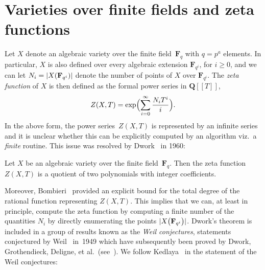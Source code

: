 

\section{Varieties over finite fields and zeta functions}

Let $X$ denote an algebraic variety over the finite field~$\mathbf{F}_q$ 
with $q = p^a$ elements.  In particular, $X$ is also defined 
over every algebraic extension $\mathbf{F}_{q^i}$, for $i \geq 0$, 
and we can let $N_i = \lvert X(\mathbf{F}_{q^i}) \rvert$ denote the number 
of points of $X$ over $\mathbf{F}_{q^i}$.  The \emph{zeta function} 
of $X$ is then defined as the formal power series in $\mathbf{Q}[[T]]$,
\begin{equation*}
Z(X, T) = \exp \Bigl( \sum_{i=0}^{\infty} \frac{N_i T^i}{i} \Bigr).
\end{equation*}
In the above form, the power series~$Z(X, T)$ is represented by an 
infinite series and it is unclear whether this can be explicitly 
computed by an algorithm viz.\ a \emph{finite} routine.  This issue 
was resolved by Dwork~\citep{Dwork1960} in 1960:

\begin{thm}
Let $X$ be an algebraic variety over the finite field~$\mathbf{F}_q$.  
Then the zeta function $Z(X, T)$ is a quotient of two polynomials with 
integer coefficients.
\end{thm}

Moreover, Bombieri~\citep{Bombieri1978} provided an explicit bound 
for the total degree of the rational function representing $Z(X, T)$.
This implies that we can, at least in principle, compute the zeta 
function by computing a finite number of the quantities $N_i$ by 
directly enumerating the points $\lvert X\bigl(\mathbf{F}_{q^i}\bigr)\rvert$.
Dwork's theorem is included in a group of results known as the 
\emph{Weil conjectures}, statements conjectured by Weil~\citep{Weil1949} 
in~1949 which have subsequently been proved by Dwork, Grothendieck, 
Deligne, et al.\ (see~\citep[Appendix~C]{Har77}).  We follow 
Kedlaya~\citep[Theorem~1.2.1]{Kedlaya2011} in the statement of the Weil 
conjectures:

